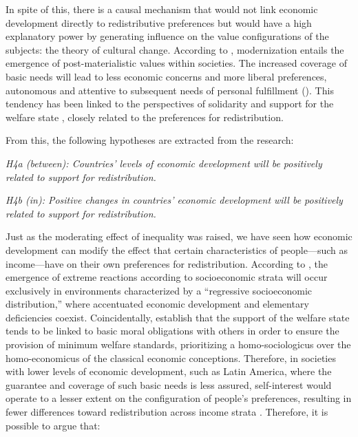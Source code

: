 \documentclass[utf8]{frontiersSCNS} %
\begin{document}
In spite of this, there is a causal mechanism that would not link economic development directly to redistributive preferences but would have a high explanatory power by generating influence on the value configurations of the subjects: the theory of cultural change. According to \textcite{InglehartLongtermtrends1977}, modernization entails the emergence of post-materialistic values within societies. The increased coverage of basic needs will lead to less economic concerns and more liberal preferences, autonomous and attentive to subsequent needs of personal fulfillment (\parencite{InglehartChangingvalueswestern2008}). This tendency has been linked to the perspectives of solidarity and support for the welfare state \parencite{GelissenPopularsupportinstitutionalised2000}, closely related to the preferences for redistribution.

From this, the following hypotheses are extracted from the research:

\textit{H4a (between): Countries’ levels of economic development will be positively related to support for redistribution.}

\textit{H4b (in): Positive changes in countries’ economic development will be positively related to support for redistribution.}

Just as the moderating effect of inequality was raised, we have seen how economic development can modify the effect that certain characteristics of people—such as income—have on their own preferences for redistribution. According to \textcite{ReenockRegressiveSocioeconomicDistribution2007}, the emergence of extreme reactions according to socioeconomic strata will occur exclusively in environments characterized by a “regressive socioeconomic distribution,” where accentuated economic development and elementary deficiencies coexist. Coincidentally, \textcite{BowlesReciprocityselfinterestwelfare2000} establish that the support of the welfare state tends to be linked to basic moral obligations with others in order to ensure the provision of minimum welfare standards, prioritizing a homo-sociologicus over the homo-economicus of the classical economic conceptions. Therefore, in societies with lower levels of economic development, such as Latin America, where the guarantee and coverage of such basic needs is less assured, self-interest would operate to a lesser extent on the configuration of people’s preferences, resulting in fewer differences toward redistribution across income strata \parencite{DionEconomicDevelopmentIncome2010}. Therefore, it is possible to argue that:
\end{document}
